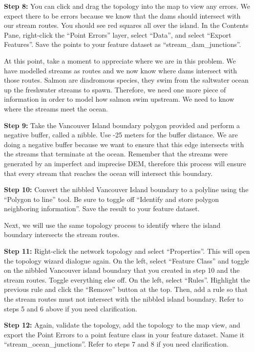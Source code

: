 \documentclass[
]{book}
\begin{document}
\textbf{Step 8:} You can click and drag the topology into the map to view any errors. We expect there to be errors because we know that the dams should intersect with our stream routes. You should see red squares all over the island. In the Contents Pane, right-click the ``Point Errors'' layer, select ``Data'', and select ``Export Features''. Save the points to your feature dataset as ``stream\_dam\_junctions''.

At this point, take a moment to appreciate where we are in this problem. We have modelled streams as routes and we now know where dams intersect with those routes. Salmon are diadromous species, they swim from the saltwater ocean up the freshwater streams to spawn. Therefore, we need one more piece of information in order to model how salmon swim upstream. We need to know where the streams meet the ocean.

\textbf{Step 9:} Take the Vancouver Island boundary polygon provided and perform a negative buffer, called a nibble. Use -25 meters for the buffer distance. We are doing a negative buffer because we want to ensure that this edge intersects with the streams that terminate at the ocean. Remember that the streams were generated by an imperfect and imprecise DEM, therefore this process will ensure that every stream that reaches the ocean will intersect this boundary.

\textbf{Step 10:} Convert the nibbled Vancouver Island boundary to a polyline using the ``Polygon to line'' tool. Be sure to toggle off ``Identify and store polygon neighboring information''. Save the result to your feature dataset.

Next, we will use the same topology process to identify where the island boundary intersects the stream routes.

\textbf{Step 11:} Right-click the network topology and select ``Properties''. This will open the topology wizard dialogue again. On the left, select ``Feature Class'' and toggle on the nibbled Vancouver island boundary that you created in step 10 and the stream routes. Toggle everything else off. On the left, select ``Rules''. Highlight the previous rule and click the ``Remove'' button at the top. Then, add a rule so that the stream routes must not intersect with the nibbled island boundary. Refer to steps 5 and 6 above if you need clarification.

\textbf{Step 12:} Again, validate the topology, add the topology to the map view, and export the Point Errors to a point feature class in your feature dataset. Name it ``stream\_ocean\_junctions''. Refer to steps 7 and 8 if you need clarification.
\end{document}
